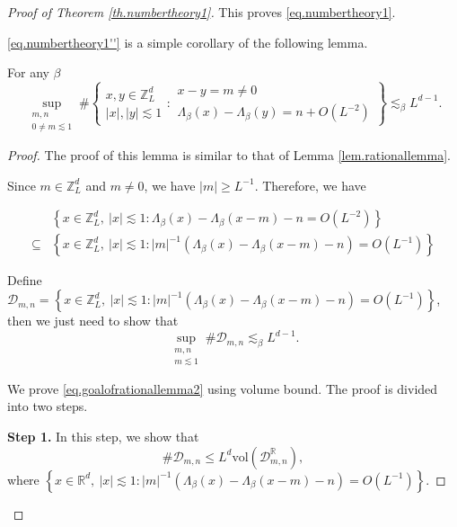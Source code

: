 \begin{proof}[Proof of Theorem \ref{th.numbertheory1}]
This proves \eqref{eq.numbertheory1}.

\eqref{eq.numbertheory1''} is a simple corollary of the following lemma. 

\begin{lem}\label{lem.rationallemma2} For any $\beta$
\begin{equation}
    \sup_{\substack{m,n\\0\ne m\lesssim 1}} \#\left\{\begin{array}{cc}
         x,y\in\mathbb{Z}^d_L  \\
         |x|,|y|\lesssim 1
    \end{array}:\begin{array}{cc}
         x-y=m\ne 0  \\
         \Lambda_{\beta}(x)-\Lambda_{\beta}(y)=n+O(L^{-2})
    \end{array}\right\}\lesssim_{\beta} L^{d-1} .
\end{equation}
\end{lem}
\begin{proof} The proof of this lemma is similar to that of Lemma \ref{lem.rationallemma}. 

Since $m\in\mathbb{Z}^d_L$ and $m\ne 0$, we have $|m|\ge L^{-1}$. Therefore, we have

\begin{equation}
\begin{split}
    &\left\{x\in \mathbb{Z}^d_L,\ |x|\lesssim 1: \Lambda_{\beta}(x)-\Lambda_{\beta}(x-m)-n=O(L^{-2})\right\}
    \\
    \subseteq& \left\{x\in \mathbb{Z}^d_L,\ |x|\lesssim 1: |m|^{-1}(\Lambda_{\beta}(x)-\Lambda_{\beta}(x-m)-n)=O(L^{-1})\right\}
\end{split}
\end{equation}

Define $\mathcal{D}_{m,n}=\left\{x\in \mathbb{Z}^d_L,\ |x|\lesssim 1: |m|^{-1}(\Lambda_{\beta}(x)-\Lambda_{\beta}(x-m)-n)=O(L^{-1})\right\}$, then we just need to show that 
\begin{equation}\label{eq.goalofrationallemma2}
    \sup_{\substack{m,n\\m\lesssim 1}} \#\mathcal{D}_{m,n}\lesssim_{\beta} L^{d-1} .
\end{equation}

We prove \eqref{eq.goalofrationallemma2} using volume bound. The proof is divided into two steps.

\textbf{Step 1.} In this step, we show that 
\begin{equation}\label{eq.goalofrationallemma2step1}
    \#\mathcal{D}_{m,n}\le L^{d} \text{vol}(\mathcal{D}^{\mathbb{R}}_{m,n}),
\end{equation}
where $\left\{x\in \mathbb{R}^d,\ |x|\lesssim 1: |m|^{-1}(\Lambda_{\beta}(x)-\Lambda_{\beta}(x-m)-n)=O(L^{-1})\right\}$.


\end{proof}
\end{proof}
